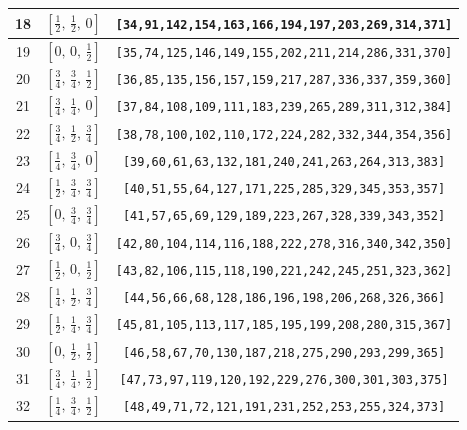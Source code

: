 \documentclass[fleqn,8pt]{jsarticle}
\begin{document}
\begin{longtable}{ccc}
18 & $\left[ \frac{1}{2},\, \frac{1}{2},\, 0 \right]$ & {\tt [34,91,142,154,163,166,194,197,203,269,314,371]} \\ \hline
19 & $\left[ 0,\, 0,\, \frac{1}{2} \right]$ & {\tt [35,74,125,146,149,155,202,211,214,286,331,370]} \\ \hline
20 & $\left[ \frac{3}{4},\, \frac{3}{4},\, \frac{1}{2} \right]$ & {\tt [36,85,135,156,157,159,217,287,336,337,359,360]} \\ \hline
21 & $\left[ \frac{3}{4},\, \frac{1}{4},\, 0 \right]$ & {\tt [37,84,108,109,111,183,239,265,289,311,312,384]} \\ \hline
22 & $\left[ \frac{3}{4},\, \frac{1}{2},\, \frac{3}{4} \right]$ & {\tt [38,78,100,102,110,172,224,282,332,344,354,356]} \\ \hline
23 & $\left[ \frac{1}{4},\, \frac{3}{4},\, 0 \right]$ & {\tt [39,60,61,63,132,181,240,241,263,264,313,383]} \\ \hline
24 & $\left[ \frac{1}{2},\, \frac{3}{4},\, \frac{3}{4} \right]$ & {\tt [40,51,55,64,127,171,225,285,329,345,353,357]} \\ \hline
25 & $\left[ 0,\, \frac{3}{4},\, \frac{3}{4} \right]$ & {\tt [41,57,65,69,129,189,223,267,328,339,343,352]} \\ \hline
26 & $\left[ \frac{3}{4},\, 0,\, \frac{3}{4} \right]$ & {\tt [42,80,104,114,116,188,222,278,316,340,342,350]} \\ \hline
27 & $\left[ \frac{1}{2},\, 0,\, \frac{1}{2} \right]$ & {\tt [43,82,106,115,118,190,221,242,245,251,323,362]} \\ \hline
28 & $\left[ \frac{1}{4},\, \frac{1}{2},\, \frac{3}{4} \right]$ & {\tt [44,56,66,68,128,186,196,198,206,268,326,366]} \\ \hline
29 & $\left[ \frac{1}{2},\, \frac{1}{4},\, \frac{3}{4} \right]$ & {\tt [45,81,105,113,117,185,195,199,208,280,315,367]} \\ \hline
30 & $\left[ 0,\, \frac{1}{2},\, \frac{1}{2} \right]$ & {\tt [46,58,67,70,130,187,218,275,290,293,299,365]} \\ \hline
31 & $\left[ \frac{3}{4},\, \frac{1}{4},\, \frac{1}{2} \right]$ & {\tt [47,73,97,119,120,192,229,276,300,301,303,375]} \\ \hline
32 & $\left[ \frac{1}{4},\, \frac{3}{4},\, \frac{1}{2} \right]$ & {\tt [48,49,71,72,121,191,231,252,253,255,324,373]} \\
\end{longtable}
\renewcommand{\arraystretch}{1.2}
\end{document}
